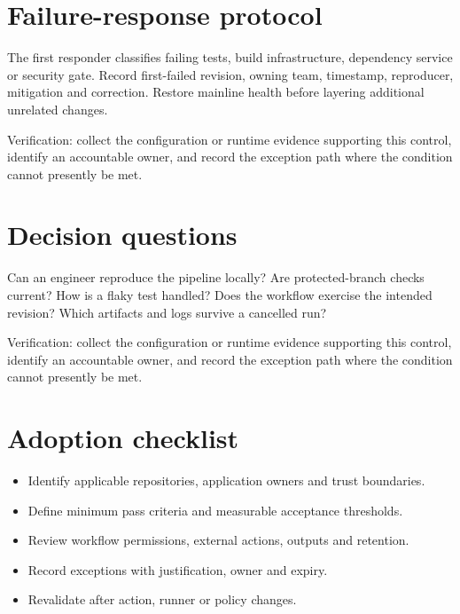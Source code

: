\documentclass[11pt,letterpaper]{article}
\begin{document}
\section{Failure-response protocol}
The first responder classifies failing tests, build infrastructure, dependency service or security gate. Record first-failed revision, owning team, timestamp, reproducer, mitigation and correction. Restore mainline health before layering additional unrelated changes.

Verification: collect the configuration or runtime evidence supporting this control, identify an accountable owner, and record the exception path where the condition cannot presently be met.

\section{Decision questions}
Can an engineer reproduce the pipeline locally? Are protected-branch checks current? How is a flaky test handled? Does the workflow exercise the intended revision? Which artifacts and logs survive a cancelled run?

Verification: collect the configuration or runtime evidence supporting this control, identify an accountable owner, and record the exception path where the condition cannot presently be met.

\section{Adoption checklist}
\begin{itemize}
\item Identify applicable repositories, application owners and trust boundaries.
\item Define minimum pass criteria and measurable acceptance thresholds.
\item Review workflow permissions, external actions, outputs and retention.
\item Record exceptions with justification, owner and expiry.
\item Revalidate after action, runner or policy changes.
\end{itemize}
\end{document}
